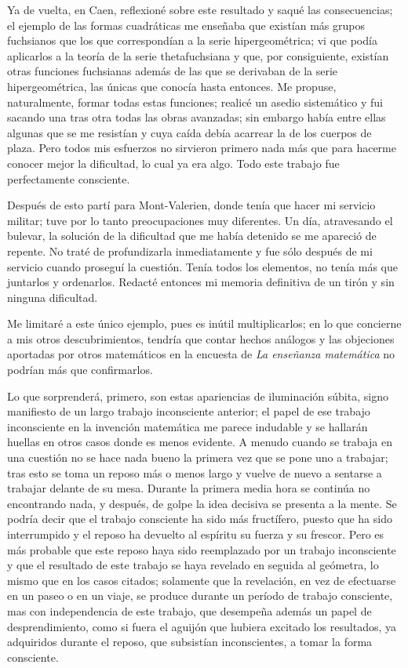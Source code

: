\documentclass[a4paper, 12pt, draft]{article}
\begin{document}
Ya de vuelta, en Caen, reflexioné sobre este resultado y saqué
las consecuencias; el ejemplo de las formas cuadráticas me enseñaba
que existían más grupos fuchsianos que los que correspondían a la serie hipergeométrica; vi que podía aplicarlos a la teoría de la serie thetafuchsiana y que, por consiguiente, existían
otras funciones fuchsianas además de las que se derivaban de la serie
hipergeométrica, las únicas que conocía hasta entonces. Me
propuse, naturalmente, formar todas estas funciones; realicé un asedio
sistemático y fui sacando una tras otra todas las obras avanzadas; sin
embargo había entre ellas algunas que se me resistían y cuya caída
debía acarrear la de los cuerpos de plaza. Pero todos mis esfuerzos no
sirvieron primero nada más que para hacerme conocer mejor la dificultad,
lo cual ya era algo. Todo este trabajo fue perfectamente consciente.

Después de esto partí para Mont-Valerien, donde tenía que
hacer mi servicio militar; tuve por lo tanto preocupaciones muy diferentes.
Un día, atravesando el bulevar, la solución de la dificultad que me
había detenido se me apareció de repente. No traté de
profundizarla inmediatamente y fue sólo después de mi
servicio cuando proseguí la cuestión. Tenía todos los
elementos, no tenía más que juntarlos y ordenarlos. Redacté
entonces mi memoria definitiva de un tirón y sin ninguna dificultad.

Me limitaré a este único ejemplo, pues es inútil multiplicarlos; en lo que concierne a mis otros descubrimientos, tendría que contar
hechos análogos y las objeciones aportadas por otros matemáticos en
la encuesta de {\it La enseñanza matemática} no podrían más que
confirmarlos.


Lo que sorprenderá, primero, son estas apariencias de iluminación súbita, signo manifiesto de un largo trabajo inconsciente anterior; el
papel de ese trabajo inconsciente en la invención matemática me
parece indudable y se hallarán huellas en otros casos donde es menos
evidente. A menudo cuando se trabaja en una cuestión no se hace nada
bueno la primera vez que se pone uno a trabajar; tras esto se toma un
reposo más o menos largo y vuelve de nuevo a sentarse a trabajar delante
de su mesa. Durante la primera media hora se continúa no encontrando
nada, y después, de golpe la idea decisiva se presenta a la mente. Se
podría decir que el trabajo consciente ha sido más fructífero,
puesto que ha sido interrumpido y el reposo ha devuelto al espíritu
su fuerza y su frescor. Pero es más probable que este reposo haya sido
reemplazado por un trabajo inconsciente y que el resultado de este trabajo
se haya revelado en seguida al geómetra, lo mismo que en los casos
citados; solamente que la revelación, en vez de efectuarse en un paseo
o en un viaje, se produce durante un período de trabajo consciente, mas
con independencia de este trabajo, que desempeña además un papel
de desprendimiento, como si fuera el aguijón que hubiera excitado los resultados, ya adquiridos durante el reposo, que subsistían inconscientes, a tomar la forma consciente.
\end{document}
